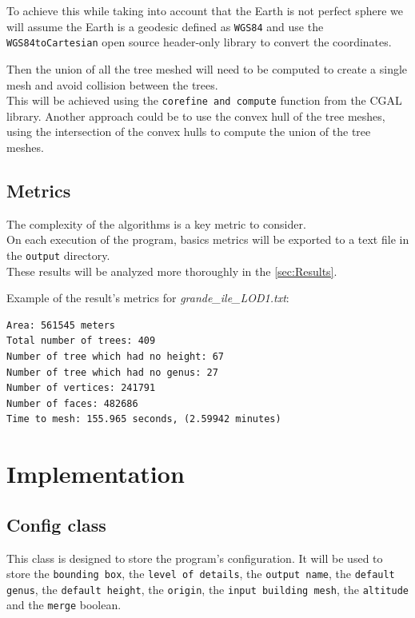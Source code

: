 \documentclass[12pt]{article}
\begin{document}
To achieve this while taking into account that the Earth is not perfect sphere
we will assume the Earth is a geodesic defined as \texttt{WGS84}\cite{wgs84} and use
the \texttt{WGS84toCartesian}\cite{wgs84_to_cartesian} open source header-only
library to convert the coordinates.

Then the union of all the tree meshed will need to be computed to create a single mesh
and avoid collision between the trees. \\
This will be achieved using the \texttt{corefine and compute}\cite{corefine-compute}
function from the CGAL library.
Another approach could be to use the convex hull of the tree meshes, using the
intersection of the convex hulls to compute the union of the tree meshes.

\subsection{Metrics}
The complexity of the algorithms is a key metric to consider. \\
On each execution of the program, basics metrics will be exported to a text file in
the \texttt{output} directory. \\
These results will be analyzed more thoroughly in the \autoref{sec:Results}.

Example of the result's metrics for \textit{grande\_ile\_LOD1.txt}:

\begin{lstlisting}
Area: 561545 meters
Total number of trees: 409
Number of tree which had no height: 67
Number of tree which had no genus: 27
Number of vertices: 241791
Number of faces: 482686
Time to mesh: 155.965 seconds, (2.59942 minutes)
\end{lstlisting}

\newpage

\section{Implementation}

\subsection{Config class}

This class is designed to store the program's configuration. It will be used to
store the \texttt{bounding box}, the \texttt{level of details}, the
\texttt{output name}, the \texttt{default genus}, the \texttt{default height},
the \texttt{origin}, the \texttt{input building mesh}, the \texttt{altitude} and 
the \texttt{merge} boolean.
\end{document}
